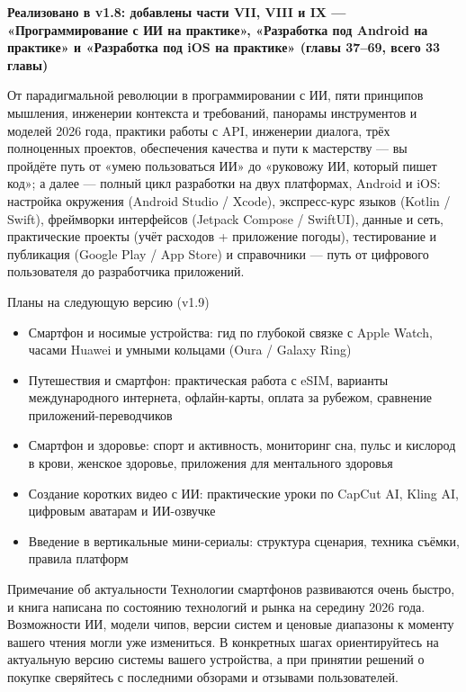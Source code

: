 

\textbf{Реализовано в v1.8: добавлены части VII, VIII и IX — «Программирование с ИИ на практике», «Разработка под Android на практике» и «Разработка под iOS на практике» (главы 37–69, всего 33 главы)}\par

От парадигмальной революции в программировании с ИИ, пяти принципов мышления, инженерии контекста и требований, панорамы инструментов и моделей 2026 года, практики работы с API, инженерии диалога, трёх полноценных проектов, обеспечения качества и пути к мастерству — вы пройдёте путь от «умею пользоваться ИИ» до «руковожу ИИ, который пишет код»; а далее — полный цикл разработки на двух платформах, Android и iOS: настройка окружения (Android Studio / Xcode), экспресс-курс языков (Kotlin / Swift), фреймворки интерфейсов (Jetpack Compose / SwiftUI), данные и сеть, практические проекты (учёт расходов + приложение погоды), тестирование и публикация (Google Play / App Store) и справочники — путь от цифрового пользователя до разработчика приложений.

\begin{tcbinfo}{Планы на следующую версию (v1.9)}
\begin{itemize}
  \item Смартфон и носимые устройства: гид по глубокой связке с Apple Watch, часами Huawei и умными кольцами (Oura / Galaxy Ring)
  \item Путешествия и смартфон: практическая работа с eSIM, варианты международного интернета, офлайн-карты, оплата за рубежом, сравнение приложений-переводчиков
  \item Смартфон и здоровье: спорт и активность, мониторинг сна, пульс и кислород в крови, женское здоровье, приложения для ментального здоровья
  \item Создание коротких видео с ИИ: практические уроки по CapCut AI, Kling AI, цифровым аватарам и ИИ-озвучке
  \item Введение в вертикальные мини-сериалы: структура сценария, техника съёмки, правила платформ
\end{itemize}

\end{tcbinfo}

\begin{tcbwarn}{Примечание об актуальности}
Технологии смартфонов развиваются очень быстро, и книга написана по состоянию технологий и рынка на середину 2026 года. Возможности ИИ, модели чипов, версии систем и ценовые диапазоны к моменту вашего чтения могли уже измениться. В конкретных шагах ориентируйтесь на актуальную версию системы вашего устройства, а при принятии решений о покупке сверяйтесь с последними обзорами и отзывами пользователей.

\end{tcbwarn}
